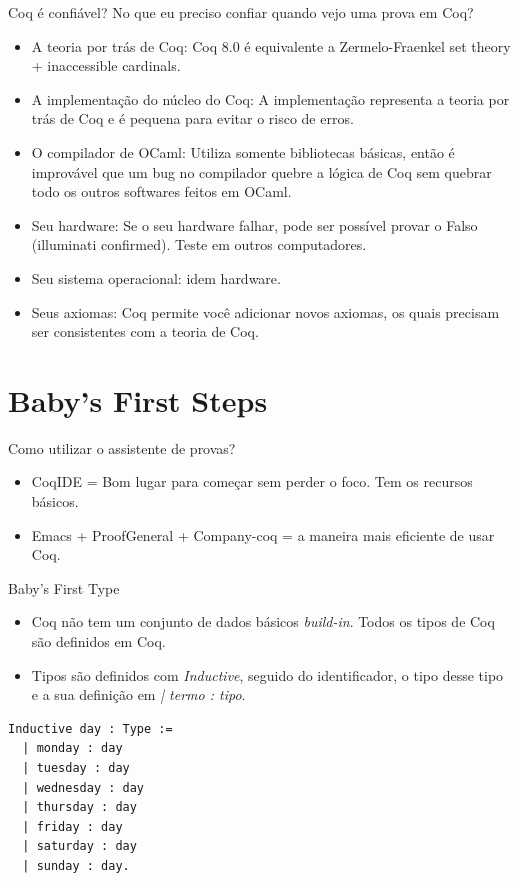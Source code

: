 \documentclass[presentation]{beamer}
\begin{document}
\begin{frame}[label={sec:org1508af0}]{Coq é confiável?}
No que eu preciso confiar quando vejo uma prova em Coq? 
\begin{itemize}
\item \alert{A teoria por trás de Coq}: Coq 8.0 é equivalente a Zermelo-Fraenkel set theory + inaccessible cardinals.
\item \alert{A implementação do núcleo do Coq}: A implementação representa a teoria por trás de Coq e é pequena para evitar o risco de erros.
\item \alert{O compilador de OCaml}: Utiliza somente bibliotecas básicas, então é improvável que um bug no compilador quebre a lógica de Coq sem quebrar todo os outros softwares feitos em OCaml.
\item \alert{Seu hardware}: Se o seu hardware falhar, pode ser possível provar o Falso (illuminati confirmed). Teste em outros computadores.
\item \alert{Seu sistema operacional}: idem hardware.
\item \alert{Seus axiomas}: Coq permite você adicionar novos axiomas, os quais precisam ser consistentes com a teoria de Coq.
\end{itemize}
\end{frame}

\section{Baby's First Steps}
\label{sec:orga9cdf13}

\begin{frame}[label={sec:org9922607}]{Como utilizar o assistente de provas?}
\begin{itemize}
\item CoqIDE = Bom lugar para começar sem perder o foco. Tem os recursos básicos.
\item Emacs + ProofGeneral + Company-coq = a maneira mais eficiente de usar Coq.
\end{itemize}
\end{frame}

\begin{frame}[fragile,label={sec:org5b1f76f}]{Baby's First Type}
 \begin{itemize}
\item Coq não tem um conjunto de dados básicos \emph{build-in}. Todos os tipos de Coq são definidos em Coq.
\item Tipos são definidos com \emph{Inductive}, seguido do identificador, o tipo desse tipo e a sua definição em \emph{| termo : tipo}.
\end{itemize}
\begin{verbatim}
Inductive day : Type :=
  | monday : day
  | tuesday : day
  | wednesday : day
  | thursday : day
  | friday : day
  | saturday : day
  | sunday : day.
\end{verbatim}
\end{frame}
\end{document}
